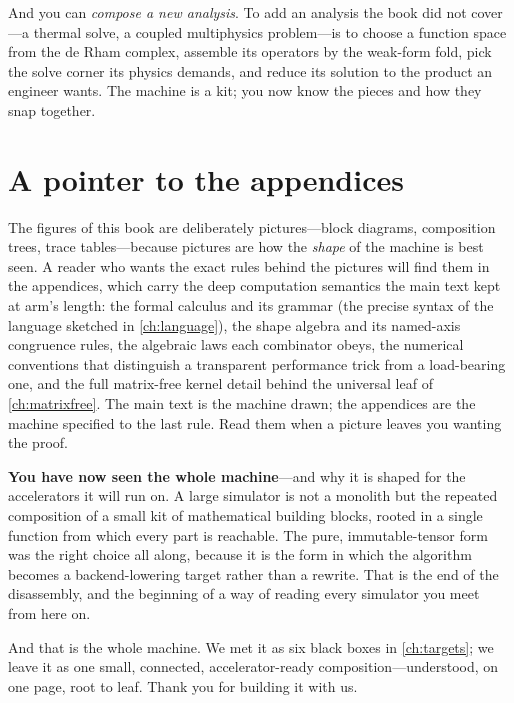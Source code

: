 And you can \emph{compose a new analysis}. To add an analysis the book did not
cover---a thermal solve, a coupled multiphysics problem---is to choose a function space
from the de Rham complex, assemble its operators by the weak-form fold, pick the solve
corner its physics demands, and reduce its solution to the product an engineer wants. The
machine is a kit; you now know the pieces and how they snap together.

\section{A pointer to the appendices}
\label{sec:wm-appendix}

The figures of this book are deliberately pictures---block diagrams, composition trees,
trace tables---because pictures are how the \emph{shape} of the machine is best seen. A
reader who wants the exact rules behind the pictures will find them in the appendices,
which carry the deep computation semantics the main text kept at arm's length: the formal
calculus and its grammar (the precise syntax of the language sketched in
\cref{ch:language}), the shape algebra and its named-axis congruence rules, the algebraic
laws each combinator obeys, the numerical conventions that distinguish a transparent
performance trick from a load-bearing one, and the full matrix-free kernel detail behind
the universal leaf of \cref{ch:matrixfree}. The main text is the machine drawn; the
appendices are the machine specified to the last rule. Read them when a picture leaves you
wanting the proof.

\begin{keyidea}
\textbf{You have now seen the whole machine}---and why it is shaped for the accelerators it
will run on. A large simulator is not a monolith but the repeated composition of a small
kit of mathematical building blocks, rooted in a single  function from which
every part is reachable. The pure, immutable-tensor form was the right choice all along,
because it is the form in which the algorithm becomes a backend-lowering target rather than
a rewrite. That is the end of the disassembly, and the beginning of a way of reading every
simulator you meet from here on.
\end{keyidea}

\medskip
\noindent And that is the whole machine. We met it as six black boxes in
\cref{ch:targets}; we leave it as one small, connected, accelerator-ready
composition---understood, on one page, root to leaf. Thank you for building it with us.

